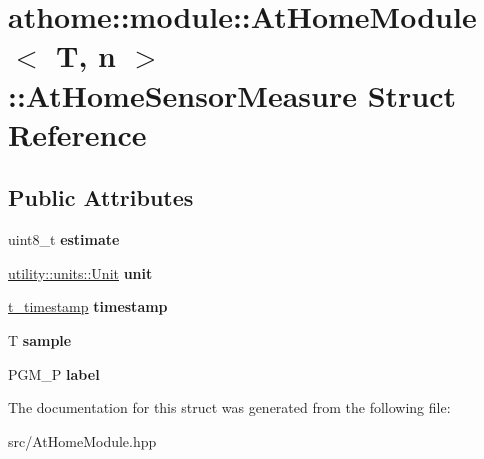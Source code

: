 \hypertarget{structathome_1_1module_1_1_at_home_module_1_1_at_home_sensor_measure}{}\section{athome\+:\+:module\+:\+:At\+Home\+Module$<$ T, n $>$\+:\+:At\+Home\+Sensor\+Measure Struct Reference}
\label{structathome_1_1module_1_1_at_home_module_1_1_at_home_sensor_measure}
\subsection*{Public Attributes}
\begin{DoxyCompactItemize}
\item 
\mbox{\label{structathome_1_1module_1_1_at_home_module_1_1_at_home_sensor_measure_a3ea2587077687a8e0951e4f64730b955}} 
uint8\+\_\+t {\bfseries estimate}
\item 
\mbox{\label{structathome_1_1module_1_1_at_home_module_1_1_at_home_sensor_measure_a317f5de5d9032ac12fd0504f709b2e8f}} 
\mbox{\hyperlink{structathome_1_1utility_1_1units_1_1_unit}{utility\+::units\+::\+Unit}} {\bfseries unit}
\item 
\mbox{\label{structathome_1_1module_1_1_at_home_module_1_1_at_home_sensor_measure_ac8060b9a02831d05cf6598558d2314d5}} 
\mbox{\hyperlink{classathome_1_1module_1_1_at_home_module_a077afdad789e433d59c588ec6c0f4594}{t\+\_\+timestamp}} {\bfseries timestamp}
\item 
\mbox{\label{structathome_1_1module_1_1_at_home_module_1_1_at_home_sensor_measure_a483e0d1c0010854a57e3a1a44f2739c0}} 
T {\bfseries sample}
\item 
\mbox{\label{structathome_1_1module_1_1_at_home_module_1_1_at_home_sensor_measure_a70a00407632c3969cabe019b7e3ba929}} 
P\+G\+M\+\_\+P {\bfseries label}
\end{DoxyCompactItemize}


The documentation for this struct was generated from the following file\+:\begin{DoxyCompactItemize}
\item 
src/At\+Home\+Module.\+hpp\end{DoxyCompactItemize}
